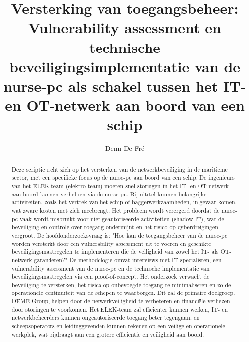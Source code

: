 \documentclass{hogent-article}
\title{Versterking van toegangsbeheer: Vulnerability assessment en 
technische beveiligingsimplementatie van de nurse-pc als schakel tussen het IT- en OT-netwerk aan boord van een schip}
\author{Demi De Fré}
\begin{document}
\begin{abstract}
  Deze scriptie richt zich op het versterken van de netwerkbeveiliging in de maritieme sector, met een specifieke focus op de 
  nurse-pc aan boord van een schip. De ingenieurs van het ELEK-team (elektro-team) moeten snel storingen in het IT- en OT-netwerk 
  aan boord kunnen verhelpen via de nurse-pc. Bij uitstel kunnen belangrijke activiteiten, zoals het vertrek van het schip of 
  baggerwerkzaamheden, in gevaar komen, wat zware kosten met zich meebrengt. Het probleem wordt verergerd doordat de nurse-pc 
  vaak wordt misbruikt voor niet-geautoriseerde activiteiten (shadow IT), wat de beveiliging en controle over toegang ondermijnt 
  en het risico op cyberdreigingen vergroot. De hoofdonderzoeksvraag is: "Hoe kan de toegangsbeheer van de nurse-pc worden 
  versterkt door een vulnerability assessment uit te voeren en geschikte beveiligingsmaatregelen te implementeren die de veiligheid 
  van zowel het IT- als OT-netwerk garanderen?" De methodologie omvat interviews met IT-specialisten, een vulnerability assessment 
  van de nurse-pc en de technische implementatie van beveiligingsmaatregelen via een proof-of-concept. Het onderzoek verwacht de 
  beveiliging te versterken, het risico op onbevoegde toegang te minimaliseren en zo de operationele continuïteit van de schepen 
  te waarborgen. Dit zal de primaire doelgroep, DEME-Group, helpen door de netwerkveiligheid te verbeteren en financiële verliezen 
  door storingen te voorkomen. Het ELEK-team zal efficiënter kunnen werken, IT- en netwerkbeheerders kunnen ongeautoriseerde toegang 
  beter tegengaan, en scheepsoperators en leidinggevenden kunnen rekenen op een veilige en operationele werkplek, wat bijdraagt aan 
  een grotere efficiëntie en veiligheid aan boord.
\end{abstract}

\tableofcontents



\printbibliography[heading=bibintoc]
 
 
\end{document}
